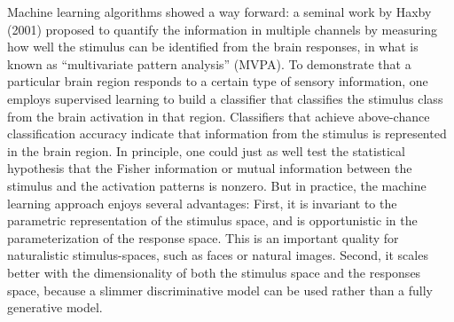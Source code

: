 \documentclass[12pt]{article}
\begin{document}
Machine learning algorithms showed a way forward: a seminal work by
Haxby (2001) proposed to quantify the information in multiple channels
by measuring how well the stimulus can be identified from the brain
responses, in what is known as ``multivariate pattern analysis''
(MVPA). To demonstrate that a particular brain region responds to a
certain type of sensory information, one employs supervised learning
to build a classifier that classifies the stimulus class from the
brain activation in that region. Classifiers that achieve above-chance
classification accuracy indicate that information from the stimulus is
represented in the brain region. In principle, one could just as well
test the statistical hypothesis that the Fisher information or mutual
information between the stimulus and the activation patterns is
nonzero. But in practice, the machine learning approach enjoys several
advantages: First, it is invariant to the parametric representation of
the stimulus space, and is opportunistic in the parameterization of
the response space. This is an important quality for naturalistic
stimulus-spaces, such as faces or natural images. Second, it scales
better with the dimensionality of both the stimulus space and the
responses space, because a slimmer discriminative model can be used
rather than a fully generative model.


\end{document}
